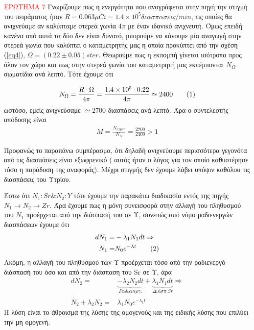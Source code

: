 \documentclass[a4paper]{article}
\newcommand\numberthis{\addtocounter{equation}{1}\tag{\theequation}}
\begin{document}
		\textcolor{red}{ΕΡΩΤΗΜΑ 7} Γνωρίζουμε πως η ενεργότητα που αναγράφεται στην πηγή την στιγμή του πειράματος ήταν $R=0.063\mu Ci = 1.4\times10^5διασπασεις/min$, τις οποίες θα ανιχνεύαμε αν καλύπταμε στερεά γωνία $4\pi$ με έναν ιδανικό ανιχνευτή.
		 Όμως επειδή κανένα από αυτά τα δύο δεν είναι δυνατό, μπορούμε να κάνουμε μία αναγωγή στην στερεά γωνία που καλύπτει ο καταμετρητής μας η οποία προκύπτει από την σχέση (\ref{eq4}), $\Omega = (0.22 \pm 0.05) ster$. Θεωρούμε πως η εκπομπή γίνεται ισότροπα προς όλον τον χώρο και πως στην στερεά γωνία του καταμετρητή μας εκπέμπονται $N_\Omega$ σωματίδια ανά λεπτό. Τότε έχουμε ότι 
	
		\begin{align*}\label{eq5}
			N_\Omega = \frac{R\cdot \Omega}{4\pi} = \frac{1.4\times10^5\cdot 0.22}{4\pi}\simeq 2400 \numberthis
		\end{align*}		
		ωστόσο, εμείς ανιχνεύσαμε $\simeq2700$ διασπάσεις ανά λεπτό. Άρα ο συντελεστής απόδοσης είναι 
			\begin{align*}
				M = \frac{N_{exper} }{N_\Omega} = \frac{2700}{2400} > 1 
			\end{align*}
			
		Προφανώς το παραπάνω συμπέρασμα, ότι δηλαδή ανιχνεύουμε περισσότερα γεγονότα από τις διασπάσεις είναι εξωφρενικό ( αυτός ήταν ο λόγος για τον οποίο καθυστέρησε τόσο η παράδοση της αναφοράς). Μέχρι στιγμής δεν έχουμε λάβει υπόψιν καθόλου τις διασπάσεις του Υτρίου.
		
		Έστω ότι $N_1: Sr \& N_2:Y$ τότε έχουμε την παρακάτω διαδικασία εντός της πηγής \textit{$N_1\rightarrow N_2 \rightarrow  Zr$}.
		Άρα έχουμε πως η μόνη συνεισφορά στην αλλαγή του πληθυσμού του $N_1$ προέρχεται από την διάσπασή του σε Υ, συνεπώς από νόμο ραδιενεργών διασπάσεων έχουμε ότι 
		\begin{align*}
			dN_1 =& -\lambda_1 N_1dt \Rightarrow\\
			N_1  =& N_0 e^{-\lambda t} \numberthis
		\end{align*}
	Ακόμη, η αλλαγή του πληθυσμού των Υ προέρχεται τόσο από την ραδιενεργό διάσπασή του όσο και από την διάσπαση του Sr σε Υ, άρα 
	\begin{align*}
		d N_2 =& \underbrace{-\lambda_2 N_2 dt}_{Ραδιενεργ.} + \underbrace{\lambda_1 N_1 dt}_{Διάσπ. Sr} \Rightarrow \\ 
		 \dot{N_2} + \lambda_2 N_2 = &\lambda_1 N_{0}e^{-\lambda_1 t}   
	\end{align*}
	Η λύση είναι το άθροισμα της λύσης της ομογενούς και της ειδικής λύσης που επιλύει την μη ομογενή.
	
\end{document}
